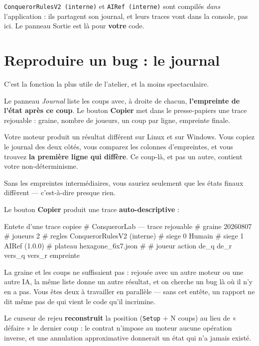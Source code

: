 \begin{nkpiege}
\texttt{ConquerorRulesV2 (interne)} et \texttt{AIRef (interne)} sont compilés
\emph{dans} l'application : ils partagent son journal, et leurs traces vont dans
la console, pas ici. Le panneau Sortie est là pour \textbf{votre} code.
\end{nkpiege}

\section{Reproduire un bug : le journal}

C'est la fonction la plus utile de l'atelier, et la moins spectaculaire.

Le panneau \emph{Journal} liste les coups avec, à droite de chacun,
\textbf{l'empreinte de l'état après ce coup}. Le bouton \textbf{Copier} met dans
le presse-papiers une trace rejouable : graine, nombre de joueurs, un coup par
ligne, empreinte finale.

\begin{nkretenir}
Votre moteur produit un résultat différent sur Linux et sur Windows. Vous copiez
le journal des deux côtés, vous comparez les colonnes d'empreintes, et vous
trouvez \textbf{la première ligne qui diffère}. Ce coup-là, et pas un autre,
contient votre non-déterminisme.

Sans les empreintes intermédiaires, vous sauriez seulement que les états finaux
diffèrent — c'est-à-dire presque rien.
\end{nkretenir}

Le bouton \textbf{Copier} produit une trace \textbf{auto-descriptive} :

\begin{nkcode}{Entete d'une trace copiee}
# ConquerorLab — trace rejouable
# graine        20260807
# joueurs       2
# regles        ConquerorRulesV2 (interne)
# siege 0       Humain
# siege 1       AIRef (1.0.0)
# plateau       hexagone_6x7.json
#
# joueur action de_q de_r vers_q vers_r empreinte
\end{nkcode}

La graine et les coups ne suffisaient pas : rejouée avec un autre moteur ou une
autre IA, la même liste donne un autre résultat, et on cherche un bug là où il
n'y en a pas. Vous êtes deux à travailler en parallèle — sans cet entête, un
rapport ne dit même pas de qui vient le code qu'il incrimine.

Le curseur de rejeu \textbf{reconstruit} la position (\texttt{Setup} $+$ N coups)
au lieu de « défaire » le dernier coup : le contrat n'impose au moteur aucune
opération inverse, et une annulation approximative donnerait un état qui n'a
jamais existé.

